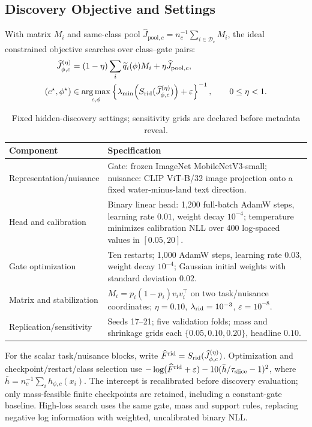 \subsection{Discovery Objective and Settings}
\label{app:discovery-objective}
With matrix $M_i$ and same-class pool $\widehat J_{\mathrm{pool},c}=n_c^{-1}\sum_{i\in\mathcal D_c}M_i$, the ideal constrained objective searches over class--gate pairs:
\begin{equation}
\begin{aligned}
\widehat J_{\phi,c}^{(\eta)}&=(1-\eta)\sum_i\widetilde q_i(\phi)M_i+\eta\widehat J_{\mathrm{pool},c},\\
(c^\star,\phi^\star)&\in\operatorname*{arg\,max}_{c,\phi}
\left\{\lambda_{\min}\!\left(S_{\mathrm{rid}}(\widehat J_{\phi,c}^{(\eta)})\right)+\varepsilon\right\}^{-1},
\qquad 0\le\eta<1.
\end{aligned}
\label{eq:hidden-slice-discovery}
\end{equation}
\begin{table}[H]
\centering\small
\caption{Fixed hidden-discovery settings; sensitivity grids are declared before metadata reveal.}
\label{tab:c-discovery-settings}
\begin{tabular}{@{}>{\raggedright\arraybackslash}p{.27\linewidth}>{\raggedright\arraybackslash}p{.68\linewidth}@{}}
\toprule
Component & Specification\\
\midrule
Representation/nuisance & Gate: frozen ImageNet MobileNetV3-small; nuisance: CLIP ViT-B/32 image projection onto a fixed water-minus-land text direction.\\
Head and calibration & Binary linear head: 1,200 full-batch AdamW steps, learning rate $0.01$, weight decay $10^{-4}$; temperature minimizes calibration NLL over 400 log-spaced values in $[0.05,20]$.\\
Gate optimization & Ten restarts; 1,000 AdamW steps, learning rate $0.03$, weight decay $10^{-4}$; Gaussian initial weights with standard deviation $0.02$.\\
Matrix and stabilization & $M_i=p_i(1-p_i)v_iv_i^\top$ on two task/nuisance coordinates; $\eta=0.10$, $\lambda_{\mathrm{rid}}=10^{-3}$, $\varepsilon=10^{-8}$.\\
Replication/sensitivity & Seeds 17--21; five validation folds; mass and shrinkage grids each $\{0.05,0.10,0.20\}$, headline $0.10$.\\
\bottomrule
\end{tabular}
\end{table}
For the scalar task/nuisance blocks, write $\widehat F^{\mathrm{rid}}=S_{\mathrm{rid}}(\widehat J_{\phi,c}^{(\eta)})$. Optimization and checkpoint/restart/class selection use $-\log(\widehat F^{\mathrm{rid}}+\varepsilon)-10(\bar h/\tau_{\mathrm{slice}}-1)^2$, where $\bar h=n_c^{-1}\sum_i h_{\phi,c}(x_i)$. The intercept is recalibrated before discovery evaluation; only mass-feasible finite checkpoints are retained, including a constant-gate baseline. High-loss search uses the same gate, mass and support rules, replacing negative log information with weighted, uncalibrated binary NLL.
